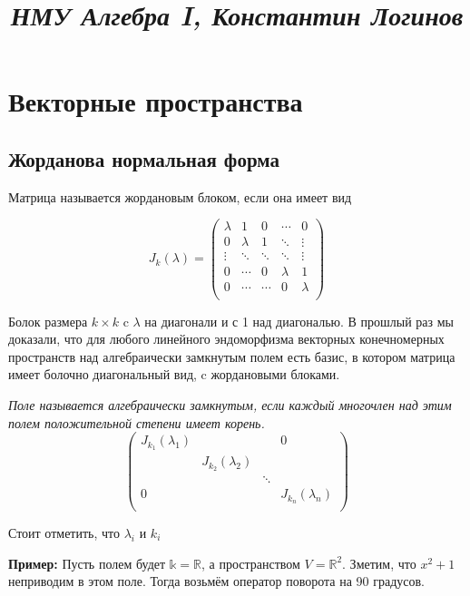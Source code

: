 \documentclass[a4paper, 12pt]{book}
\title{
\textit{\huge{НМУ Алгебра I, Константин Логинов}}
}
\date{\vspace{-10ex}}
\begin{document}
\maketitle
\chapter{Векторные пространства}
\section{Жорданова нормальная форма}
Матрица называется жордановым блоком, если она имеет вид

\[J_k(\lambda)=\left(\begin{array}{ccccc}
    \lambda & 1       & 0      & \cdots  & 0\\
    0       & \lambda & 1      & \ddots  & \vdots\\
    \vdots  & \ddots  & \ddots & \ddots  & \vdots\\
    0       & \cdots  & 0      & \lambda & 1\\
    0       & \cdots  & \cdots & 0       & \lambda\\
\end{array}\right)\]

Болок размера $k\times k$ c $\lambda$ на диагонали и с 1 над диагональю. В
прошлый раз мы доказали, что для любого линейного эндоморфизма векторных
конечномерных пространств над алгебраически замкнутым полем есть базис, в
котором матрица имеет болочно диагональный вид, c жордановыми блоками.

\textit{Поле называется алгебраически замкнутым, если каждый многочлен над этим
полем положительной степени имеет корень.}
\[
    \left(\begin{array}{cccc}
        J_{k_1}(\lambda_1) &                    &        & 0\\
                           & J_{k_2}(\lambda_2) &        & \\
                           &                    & \ddots & \\
        0                  &                    &        & J_{k_n}(\lambda_n)\\
    \end{array}\right)
\]

Стоит отметить, что $\lambda_i$ и $k_i$

\textbf{Пример:} Пусть полем будет $\mathbb{k}=\mathbb{R}$, а пространством
$V=\mathbb{R}^2$. Зметим, что $x^2+1$ неприводим в этом поле. Тогда возьмём
оператор поворота на 90 градусов.
\end{document}
